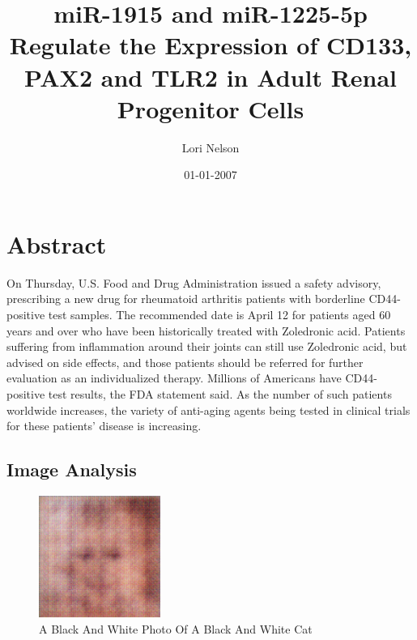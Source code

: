 \documentclass{article}%
\title{miR{-}1915 and miR{-}1225{-}5p Regulate the Expression of CD133, PAX2 and TLR2 in Adult Renal Progenitor Cells}%
\author{Lori Nelson}%
\affil{Department of Pharmacology, Guangdong Medical College, Dongguan 523{-}808, China}%
\date{01{-}01{-}2007}%
\begin{document}
%
\normalsize%
\maketitle%
\section{Abstract}%
\label{sec:Abstract}%
On Thursday, U.S. Food and Drug Administration issued a safety advisory, prescribing a new drug for rheumatoid arthritis patients with borderline CD44{-}positive test samples.\newline%
The recommended date is April 12 for patients aged 60 years and over who have been historically treated with Zoledronic acid.\newline%
Patients suffering from inflammation around their joints can still use Zoledronic acid, but advised on side effects, and those patients should be referred for further evaluation as an individualized therapy.\newline%
Millions of Americans have CD44{-}positive test results, the FDA statement said. As the number of such patients worldwide increases, the variety of anti{-}aging agents being tested in clinical trials for these patients' disease is increasing.

%
\subsection{Image Analysis}%
\label{subsec:ImageAnalysis}%


\begin{figure}[h!]%
\centering%
\includegraphics[width=150px]{500_fake_images/samples_5_230.png}%
\caption{A Black And White Photo Of A Black And White Cat}%
\end{figure}

%
\end{document}
